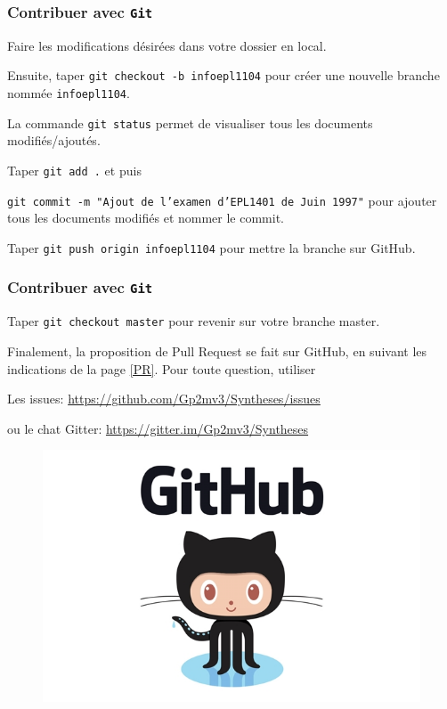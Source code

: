\documentclass{beamer}
\newenvironment{wideitemize}{\itemize\addtolength{\itemsep}{10pt}}{\enditemize}
\begin{document}
\begin{frame}
\label{modif_local}
    \frametitle{Contribuer avec \texttt{Git}}
    \begin{wideitemize}
         \item Faire les modifications désirées dans votre dossier en local.
         \item Ensuite, taper \lstinline[mathescape]|git checkout -b infoepl1104| pour créer une nouvelle branche nommée \lstinline[mathescape]|infoepl1104|.
         \item La commande \lstinline[mathescape]|git status| permet de visualiser tous les documents modifiés/ajoutés.
         \item Taper \lstinline[mathescape]|git add .| et puis
         
         \texttt{git commit -m "Ajout de l'examen d'EPL1401 de Juin 1997"} pour ajouter tous les documents modifiés et nommer le commit.
         \item Taper \lstinline[mathescape]|git push origin infoepl1104| pour mettre la branche sur GitHub.
     \end{wideitemize}
\end{frame}

\begin{frame}
    \frametitle{Contribuer avec \texttt{Git}}
    \begin{wideitemize}
         \item Taper \lstinline[mathescape]|git checkout master| pour revenir sur votre branche master.
         \item Finalement, la proposition de Pull Request se fait sur GitHub, en suivant les indications de la page \ref{PR}.
     \end{wideitemize}
Pour toute question, utiliser 
    \begin{wideitemize}
         \item Les issues: \url{https://github.com/Gp2mv3/Syntheses/issues}
         \item ou le chat Gitter: \url{https://gitter.im/Gp2mv3/Syntheses}
     \end{wideitemize}
    \begin{figure}[H]
        \centering
        \includegraphics[width=0.3\linewidth]{github-logo.jpg}
    \end{figure}
\end{frame}
\end{document}
